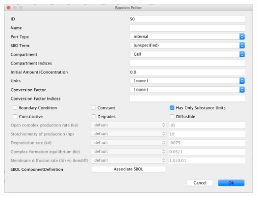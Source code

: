 \documentclass[titlepage,11pt]{article}
\begin{document}
\begin{center}
\includegraphics[width=160mm]{screenshots/speciesGT}
\end{center}




\end{document}
